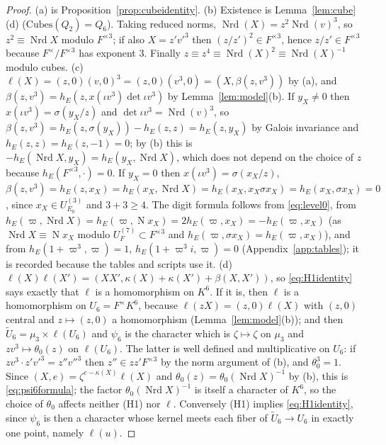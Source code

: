 \documentclass[11pt]{article}
\newcommand{\Nm}{\operatorname N}
\newcommand{\Nrd}{\operatorname{Nrd}}
\newcommand{\tU}{\widetilde U}
\newcommand{\Cubes}{\mathrm{Cubes}}
\theoremstyle{plain}
\theoremstyle{definition}
\begin{document}
\begin{proof}
(a) is Proposition~\ref{prop:cubeidentity}.  (b) Existence is
Lemma~\ref{lem:cube}(d) ($\Cubes(Q_2)=Q_6$).  Taking reduced norms,
$\Nrd(X)=z^2\Nrd(v)^3$, so $z^2\equiv\Nrd X$ modulo $F^{\times3}$; if
also $X=z'v'^3$ then $(z/z')^2\in F^{\times3}$, hence $z/z'\in F^{\times3}$
because $F^\times/F^{\times3}$ has exponent $3$.  Finally
$z\equiv z^4\equiv\Nrd(X)^2\equiv\Nrd(X)^{-1}$ modulo cubes.  (c) $\ell(X)=(z,0)(v,0)^3=(z,0)(v^3,0)=(X,\beta(z,v^3))$
by (a), and $\beta(z,v^3)=h_E(z,x(\iota v^3)\det\iota v^3)$ by
Lemma~\ref{lem:model}(b).  If $y_X\ne0$ then $x(\iota v^3)=\sigma(y_X/z)$
and $\det\iota v^3=\Nrd(v)^3$, so
$\beta(z,v^3)=h_E(z,\sigma(y_X))-h_E(z,z)=h_E(z,y_X)$ by Galois
invariance and $h_E(z,z)=h_E(z,-1)=0$; by (b) this is
$-h_E(\Nrd X,y_X)=h_E(y_X,\Nrd X)$, which does not depend on the choice
of $z$ because $h_E(F^{\times3},\cdot)=0$.  If $y_X=0$ then
$x(\iota v^3)=\sigma(x_X/z)$, $\beta(z,v^3)=h_E(z,x_X)=h_E(x_X,\Nrd X)=h_E(x_X,x_X\sigma x_X)=h_E(x_X,\sigma x_X)=0$,
since $x_X\in U^{(3)}_{E_0}$ and $3+3\ge4$.  The digit formula follows
from \eqref{eq:level0}, from $h_E(\varpi,\Nrd X)=h_E(\varpi,\Nm x_X)=2h_E(\varpi,x_X)=-h_E(\varpi,x_X)$
(as $\Nrd X\equiv\Nm x_X$ modulo $U^{(7)}_F\subset F^{\times3}$ and
$h_E(\varpi,\sigma x_X)=h_E(\varpi,x_X)$), and from $h_E(1+\varpi^3,\varpi)=1$,
$h_E(1+\varpi^3i,\varpi)=0$ (Appendix~\ref{app:tables}); it is recorded
because the tables and scripts use it.  (d)
$\ell(X)\ell(X')=(XX',\kappa(X)+\kappa(X')+\beta(X,X'))$, so
\eqref{eq:H1identity} says exactly that $\ell$ is a homomorphism on
$K^6$.  If it is, then $\ell$ is a homomorphism on $U_6=F^\times K^6$,
because $\ell(zX)=(z,0)\ell(X)$ with $(z,0)$ central and $z\mapsto(z,0)$
a homomorphism (Lemma~\ref{lem:model}(b)); and then
$\tU_6=\mu_3\times\ell(U_6)$ and $\psi_6$ is the character which is
$\zeta\mapsto\zeta$ on $\mu_3$ and $zv^3\mapsto\theta_0(z)$ on
$\ell(U_6)$.  The latter is well defined and multiplicative on $U_6$:
if $zv^3\cdot z'v'^3=z''v''^3$ then $z''\in zz'F^{\times3}$ by the norm
argument of (b), and $\theta_0^3=1$.  Since $(X,e)=\zeta^{e-\kappa(X)}\ell(X)$
and $\theta_0(z)=\theta_0(\Nrd X)^{-1}$ by (b), this is
\eqref{eq:psi6formula}; the factor $\theta_0(\Nrd X)^{-1}$ is itself a
character of $K^6$, so the choice of $\theta_0$ affects neither (H1) nor
$\ell$.  Conversely (H1) implies \eqref{eq:H1identity}, since $\psi_6$
is then a character whose kernel meets each fiber of $\tU_6\to U_6$ in
exactly one point, namely $\ell(u)$.
\end{proof}
\end{document}
